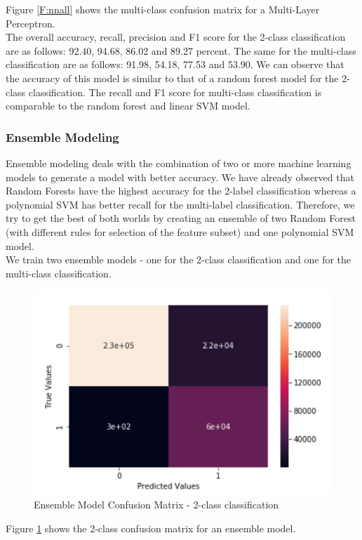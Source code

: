 Figure \ref{F:nnall} shows the multi-class confusion matrix for a Multi-Layer Perceptron.\\
The overall accuracy, recall, precision and F1 score for the 2-class classification are as follows: 92.40, 94.68, 86.02 and 89.27 percent. The same for the multi-class classification are as follows: 91.98, 54.18, 77.53
and 53.90. We can observe that the accuracy of this model is similar to that of a random forest model for the 2-class classification. The recall and F1 score for multi-class classification is comparable to the random forest and linear SVM model.

\subsubsection{Ensemble Modeling}
Ensemble modeling deals with the combination of two or more machine learning models to generate a model with better accuracy. We have already observed that Random Forests have the highest accuracy for the 2-label classification whereas a polynomial SVM has better recall for the multi-label classification. Therefore, we try to get the best of both worlds by creating an ensemble of two Random Forest (with different rules for selection of the feature subset) and one polynomial SVM model.\\
We train two ensemble models - one for the 2-class classification and one for the multi-class classification. 
\begin{figure}
	\includegraphics[width=1.0\columnwidth]{images/ensemble2.PNG}
	\caption{Ensemble Model Confusion Matrix - 2-class classification}
	\label{F:en2}
\end{figure}
Figure \ref{F:en2} shows the 2-class confusion matrix for an ensemble model.
